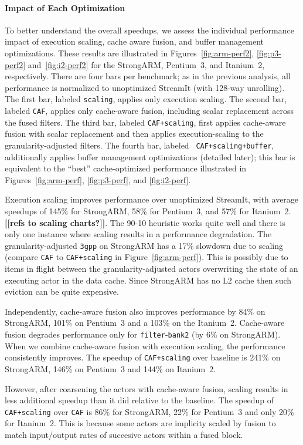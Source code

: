 \paragraph*{Impact of Each Optimization}
To better understand the overall speedups, we assess the individual
performance impact of execution scaling, cache aware fusion, and
buffer management optimizations.  These results are illustrated in
Figures~\ref{fig:arm-perf2}, \ref{fig:p3-perf2} and~\ref{fig:i2-perf2}
for the StrongARM, Pentium~3, and Itanium~2, respectively.  There are
four bars per benchmark; as in the previous analysis, all performance
is normalized to unoptimized StreamIt (with 128-way unrolling).  The
first bar, labeled {\tt scaling}, applies only execution scaling.  The
second bar, labeled {\tt CAF}, applies only cache-aware fusion,
including scalar replacement across the fused filters.  The third bar,
labeled {\tt CAF+scaling}, first applies cache-aware fusion with
scalar replacement and then applies execution-scaling to the
granularity-adjusted filters.  The fourth bar, labeled {\tt
CAF+scaling+buffer}, additionally applies buffer management
optimizations (detailed later); this bar is equivalent to the ``best''
cache-optimized performance illustrated in Figures~\ref{fig:arm-perf},
\ref{fig:p3-perf}, and \ref{fig:i2-perf}.

Execution scaling improves performance over unoptimized StreamIt, with
average speedups of 145\% for StrongARM, 58\% for Pentium~3, and 57\%
for Itanium~2.  {\bf [[refs to scaling charts?]]}.  The 90-10
heuristic works quite well and there is only one instance where
scaling results in a performance degradation. The granularity-adjusted
\texttt{3gpp} on StrongARM has a 17\% slowdown due to scaling (compare
{\tt CAF} to {\tt CAF+scaling} in Figure~\ref{fig:arm-perf}).  This is
possibly due to items in flight between the granularity-adjusted
actors overwriting the state of an executing actor in the data cache.
Since StrongARM has no L2 cache then such eviction can be quite
expensive.

Independently, cache-aware fusion also improves performance by 84\% on
StrongARM, 101\% on Pentium~3 and a 103\% on the Itanium~2.
Cache-aware fusion degrades performance only for
\texttt{filter}-\texttt{bank2} (by 6\% on StrongARM). When we combine
cache-aware fusion with execution scaling, the performance
consistently improves.  The speedup of \texttt{CAF+scaling} over
baseline is 241\% on StrongARM, 146\% on Pentium~3 and 144\% on
Itanium~2.

However, after coarsening the actors with cache-aware fusion, scaling
results in less additional speedup than it did relative to the
baseline.  The speedup of \texttt{CAF+scaling} over \texttt{CAF} is
86\% for StrongARM, 22\% for Pentium~3 and only 20\% for Itanium~2.
This is because some actors are implicity scaled by fusion to match
input/output rates of succesive actors within a fused block.

